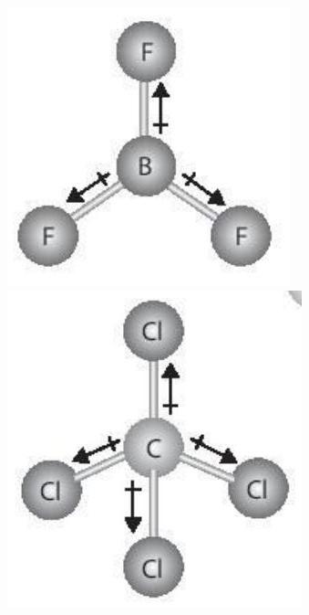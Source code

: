 \documentclass[10pt]{article}
\begin{document}
\includegraphics[max width=\textwidth, center]{2025_10_23_57761e23b8c46a11c3efg-27(1)}\\
\includegraphics[max width=\textwidth, center]{2025_10_23_57761e23b8c46a11c3efg-27(3)}\\
\end{document}
